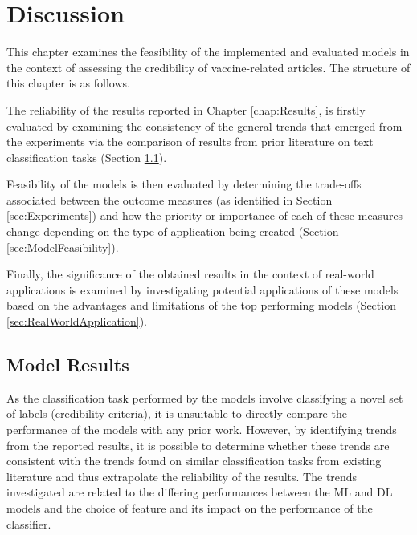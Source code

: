 \documentclass[a4paper,twoside,phd]{BYUPhys}
\begin{document}
\chapter{Discussion}
\label{chap:Discussion}

This chapter examines the feasibility of the implemented and evaluated models in the context of assessing the credibility of vaccine-related articles. The structure of this chapter is as follows. \newline

The reliability of the results reported in Chapter \ref{chap:Results}, is firstly evaluated by examining the consistency of the general trends that emerged from the experiments via the comparison of results from prior literature on text classification tasks (Section \ref{sec:ModelResults}). \newline

Feasibility of the models is then evaluated by determining the trade-offs associated between the outcome measures (as identified in Section \ref{sec:Experiments}) and how the priority or importance of each of these measures change depending on the type of application being created (Section \ref{sec:ModelFeasibility}). \newline

Finally, the significance of the obtained results in the context of real-world applications is examined by investigating potential applications of these models based on the advantages and limitations of the top performing models (Section \ref{sec:RealWorldApplication}).

\section{Model Results}
\label{sec:ModelResults}

As the classification task performed by the models involve classifying a novel set of labels (credibility criteria), it is unsuitable to directly compare the performance of the models with any prior work. However, by identifying trends from the reported results, it is possible to determine whether these trends are consistent with the trends found on similar classification tasks from existing literature and thus extrapolate the reliability of the results. The trends investigated are related to the differing performances between the ML and DL models and the choice of feature and its impact on the performance of the classifier.
\end{document}
